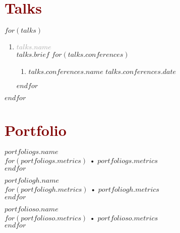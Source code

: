 \documentclass[$fontsize$, a4paper]{article}
\begin{document}
\section*{\textcolor{Maroon}{Talks}}
$for(talks)$

  \begin{enumerate}
    [topsep=10pt,itemsep=0pt,parsep=0pt,partopsep=0pt,leftmargin=10pt,label=•]
    \item{\textcolor{darkgray}{\textbf{$talks.name$}}\\$talks.brief$}
    $for(talks.conferences)$
    \begin{enumerate}
      [topsep=0pt,itemsep=0pt,parsep=0pt,partopsep=0pt,leftmargin=10pt,label=•]
      \item{\href{$talks.conferences.url$}{$talks.conferences.name$} \hfill $talks.conferences.date$}
    \end{enumerate}
    $endfor$
  \end{enumerate}

$endfor$

\section*{\textcolor{Maroon}{Portfolio}}
\begin{multicols}{3}
  \textcolor{darkgray}{} \href{$portfoliogs.url$}{$portfoliogs.name$}\\
  $for(portfoliogs.metrics)$
    • $portfoliogs.metrics$\\
  $endfor$

\columnbreak
  \textcolor{darkgray}{} \href{$portfoliogh.url$}{$portfoliogh.name$}\\
  $for(portfoliogh.metrics)$
    • $portfoliogh.metrics$\\
  $endfor$

\columnbreak
  \textcolor{darkgray}{} \href{$portfolioso.url$}{$portfolioso.name$}\\
  $for(portfolioso.metrics)$
    • $portfolioso.metrics$\\
  $endfor$
\end{multicols}
\end{document}
